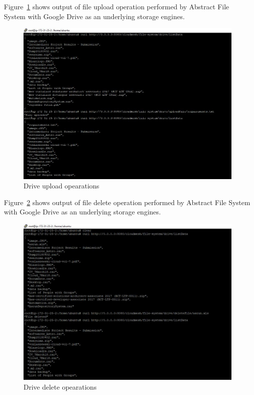 Figure~\ref{fig:drive-upload} shows output of file upload operation performed 
by Abstract File System with Google Drive as an underlying storage engines. 

\begin{figure}[!ht]
        \centering\includegraphics[width=\columnwidth]
        {image/drive-upload.JPG}
        \caption{Drive upload opearations}\label{fig:drive-upload}
\end{figure}


Figure~\ref{fig:drive-delete} shows output of file delete operation performed 
by Abstract File System with Google Drive as an underlying storage engines. 

\begin{figure}[!ht]
        \centering\includegraphics[width=\columnwidth]
        {image/drive-delete.JPG}
        \caption{Drive delete opearations}\label{fig:drive-delete}
\end{figure}



